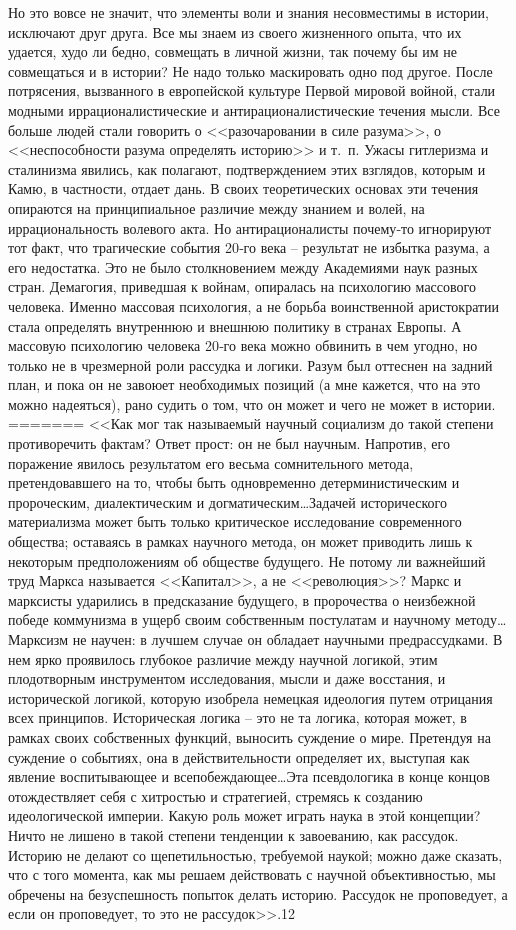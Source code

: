 \documentclass{book}
\begin{document}
Но это вовсе не значит, что элементы воли и знания несовместимы в истории, исключают друг друга. Все мы знаем из своего жизненного опыта, что их удается, худо ли бедно, сов­мещать в личной жизни, так почему бы им не совмещаться и в истории? Не надо только маскировать одно под другое. После потрясения, вызванного в европейской культуре Первой мировой войной, стали модными иррационалистические и антирационалистические течения мысли. Все больше людей стали говорить о <<разочаровании в силе разума>>, о <<неспособности разума определять историю>> и т.~п. Ужасы гитлеризма и сталинизма явились, как полагают, подтверждением этих взглядов, которым и Камю, в частности, отдает дань. В своих теоретических основах эти течения опираются на принципиальное различие между знанием и волей, на иррациональность волевого акта. Но антирационалисты почему‑то игнорируют тот факт, что тра­гические события 20‑го века -- результат не избытка разума, а его недостатка. Это не было столкновением между Академиями наук разных стран. Демагогия, приведшая к войнам, опиралась на психологию массового человека.  Именно массовая психология, а не борьба воинственной аристократии стала определять внутреннюю и внешнюю политику в странах Европы. А массовую психологию человека 20‑го века можно обвинить в чем угодно, но только не в чрезмерной роли рассудка и логики. Разум был оттеснен на задний план, и пока он не завоюет необходимых позиций (а мне кажется, что на это можно надеяться), рано судить о том, что он может и чего не может в истории.
=======
<<Как мог так называемый научный социализм до такой степени противоречить фактам? Ответ прост: он не был научным. Напротив, его поражение явилось результатом его весьма сомнительного метода, претендовавшего на то, чтобы быть одновременно детерминистическим и пророческим, диалектическим и догматическим\ldots Задачей исторического материализма может быть только критическое исследование современного общества; оставаясь в рамках научного метода, он может приводить лишь к некоторым предположениям об обществе будущего. Не потому ли важнейший труд Маркса называется <<Капитал>>, а не <<революция>>? Маркс и марксисты ударились в предсказание будущего, в пророчества о неизбежной победе коммунизма в ущерб своим собственным постулатам и научному методу\ldots Марксизм не научен: в лучшем случае он обладает научными предрассудками. В нем ярко проявилось глубокое различие между научной логикой, этим плодотворным инструментом исследования, мысли и даже восстания, и исторической логикой, которую изобрела немецкая идеология путем 
отрицания всех принципов. Историческая логика -- это не та логика, которая может, в рамках своих собственных функций, выносить сужде­ние о мире. Претендуя на суждение о событиях, она в действи­тельности определяет их, выступая как явление воспитывающее и всепобеждающее\ldots Эта псевдологика в конце концов отождествляет себя с хитростью и стратегией, стремясь к созданию идеологической империи. Какую роль может играть наука в этой концепции? Ничто не лишено в такой степени тенденции к завоеванию, как рассудок. Историю не делают со щепетиль­ностью, требуемой наукой; можно даже сказать, что с того мо­мента, как мы решаем действовать с научной объективностью, мы обречены на безуспешность попыток делать историю. Рас­судок не проповедует, а если он проповедует, то это не рассу­док>>.12
\end{document}
